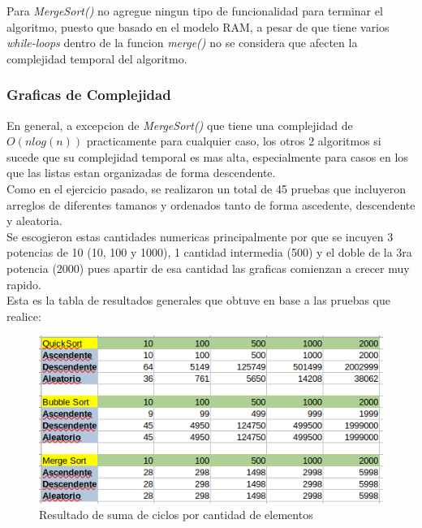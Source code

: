 \documentclass{article}
\begin{document}
		Para \emph{MergeSort()} no agregue ningun tipo de funcionalidad para terminar el algoritmo, puesto que basado en el modelo RAM, a pesar de que tiene varios \emph{while-loops} dentro de la funcion \emph{merge()} no se considera que afecten la complejidad temporal del algoritmo.\\
		
		\subsubsection{Graficas de Complejidad}
		
		En general, a excepcion de \emph{MergeSort()} que tiene una complejidad de $O(n log(n))$ practicamente para cualquier caso, los otros 2 algoritmos si sucede que su complejidad temporal es mas alta, especialmente para casos en los que las listas estan organizadas de forma descendente.\\
		
		Como en el ejercicio pasado, se realizaron un total de 45 pruebas que incluyeron arreglos de diferentes tamanos y ordenados tanto de forma ascedente, descendente y aleatoria.\\
		
		Se escogieron estas cantidades numericas principalmente por que se incuyen 3 potencias de 10 (10, 100 y 1000), 1 cantidad intermedia (500) y el doble de la 3ra potencia (2000) pues apartir de esa cantidad las graficas comienzan a crecer muy rapido.\\
		
		Esta es la tabla de resultados generales que obtuve en base a las pruebas que realice:
		
		\begin{figure}[H]
			\centering
			\includegraphics[scale = 0.7]{images/e4t.png}
			\caption{Resultado de suma de ciclos por cantidad de elementos}
		\end{figure}
	\newpage
	
\end{document}
